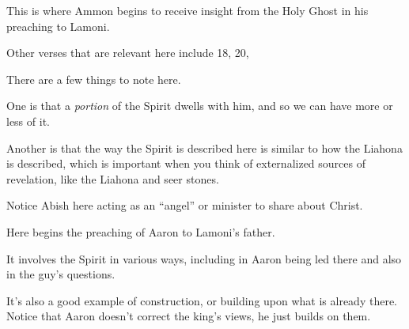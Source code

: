 \begin{compactdesc}
\begin{compactitem}
				\end{compactitem}
			\item[{\hyperref[ALMA-18-16]{Alma 18:16}}] \phantom{.}
				\begin{compactitem}
					\item This is where Ammon begins to receive insight from the Holy Ghost in his preaching to Lamoni.
					\item Other verses that are relevant here include 18, 20,
				\end{compactitem}
			\item[{\hyperref[ALMA-18-35]{Alma 18:35}}] \phantom{.}
				\begin{compactitem}
					\item There are a few things to note here. 
					\item One is that a \textit{portion} of the Spirit dwells with him, and so we can have more or less of it. 
					\item Another is that the way the Spirit is described here is similar to how the Liahona is described, which is important when you think of externalized sources of revelation, like the Liahona and seer stones.
				\end{compactitem}
			\item[{\hyperref[ALMA-19-6]{Alma 19:6}}]
			\item[{\hyperref[ALMA-19-16]{Alma 19:16--17}}] \phantom{.}
				\begin{compactitem}
					\item Notice Abish here acting as an ``angel'' or minister to share about Christ.
				\end{compactitem}
			\item[{\hyperref[ALMA-20-4]{Alma 20:4--6}}]
			\item[{\hyperref[ALMA-21-16]{Alma 21:16--17}}]
			\item[{\hyperref[ALMA-22]{Alma 22}}] \phantom{.}
				\begin{compactitem}
					\item Here begins the preaching of Aaron to Lamoni's father.
					\item It involves the Spirit in various ways, including in Aaron being led there and also in the guy's questions.
					\item It's also a good example of construction, or building upon what is already there. Notice that Aaron doesn't correct the king's views, he just builds on them.
				\end{compactitem}
			\item[{\hyperref[ALMA-23-6]{Alma 23:6}}]

\end{compactdesc}
